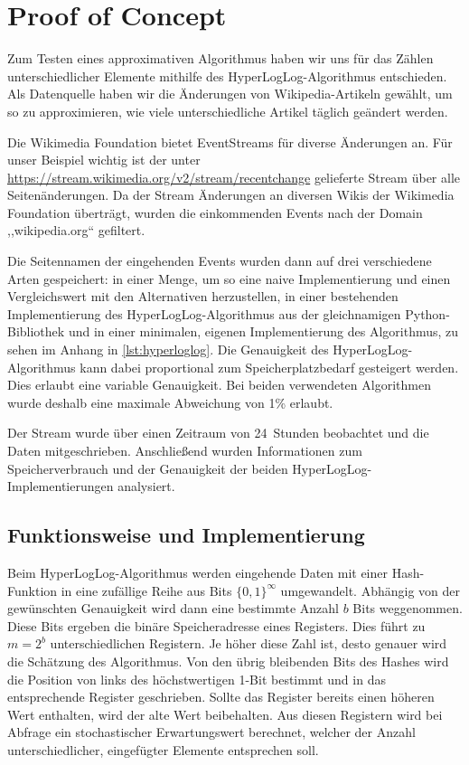 \section{Proof of Concept}

Zum Testen eines approximativen Algorithmus haben wir uns für das Zählen unterschiedlicher Elemente mithilfe des HyperLogLog-Algorithmus entschieden.
Als Datenquelle haben wir die Änderungen von Wikipedia-Artikeln gewählt, um so zu approximieren, wie viele unterschiedliche Artikel täglich geändert werden.

Die Wikimedia Foundation bietet EventStreams für diverse Änderungen an.
Für unser Beispiel wichtig ist der unter \url{https://stream.wikimedia.org/v2/stream/recentchange} gelieferte Stream über alle Seitenänderungen.
Da der Stream Änderungen an diversen Wikis der Wikimedia Foundation überträgt, wurden die einkommenden Events nach der Domain ,,wikipedia.org`` gefiltert.

Die Seitennamen der eingehenden Events wurden dann auf drei verschiedene Arten gespeichert:  in einer Menge, um so eine naive Implementierung und einen Vergleichswert mit den Alternativen herzustellen, in einer bestehenden Implementierung des HyperLogLog-Algorithmus aus der gleichnamigen Python-Bibliothek \cite{evseenko2018} und in einer minimalen, eigenen Implementierung des Algorithmus, zu sehen im Anhang in \autoref{lst:hyperloglog}.
Die Genauigkeit des HyperLogLog-Algorithmus kann dabei proportional zum Speicherplatzbedarf gesteigert werden.
Dies erlaubt eine variable Genauigkeit.
Bei beiden verwendeten Algorithmen wurde deshalb eine maximale Abweichung von 1\% erlaubt.

Der Stream wurde über einen Zeitraum von 24~Stunden beobachtet und die Daten mitgeschrieben.
Anschließend wurden Informationen zum Speicherverbrauch und der Genauigkeit der beiden HyperLogLog-Implementierungen analysiert.

\subsection{Funktionsweise und Implementierung}

Beim HyperLogLog-Algorithmus werden eingehende Daten mit einer Hash-Funktion in eine zufällige Reihe aus Bits $\{0, 1\}^\infty$ umgewandelt.
Abhängig von der gewünschten Genauigkeit wird dann eine bestimmte Anzahl $b$ Bits weggenommen.
Diese Bits ergeben die binäre Speicheradresse eines Registers.
Dies führt zu $m=2^b$ unterschiedlichen Registern.
Je höher diese Zahl ist, desto genauer wird die Schätzung des Algorithmus.
Von den übrig bleibenden Bits des Hashes wird die Position von links des höchstwertigen 1-Bit bestimmt und in das entsprechende Register geschrieben.
Sollte das Register bereits einen höheren Wert enthalten, wird der alte Wert beibehalten.
Aus diesen Registern wird bei Abfrage ein stochastischer Erwartungswert berechnet, welcher der Anzahl unterschiedlicher, eingefügter Elemente entsprechen soll.
\cite{flajolet2007}

